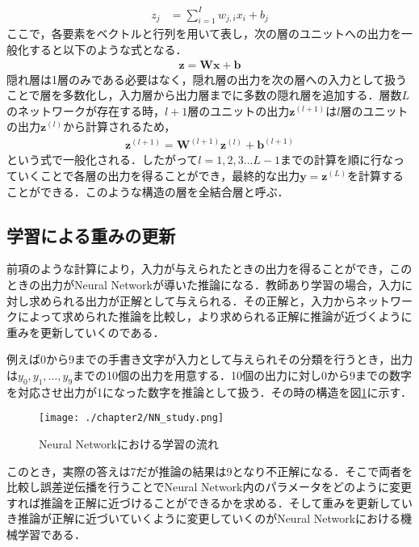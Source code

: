 \begin{align}
z_{j} &= \sum^{I}_{i=1}w_{j,i}x_{i} + b_j
\label{nn_siki}
\end{align}
ここで，各要素をベクトルと行列を用いて表し，次の層のユニットへの出力を一般化すると以下のような式となる．
\begin{align}
\bm{z} = \bm{W}\bm{x} + \bm{b}
\end{align}
隠れ層は1層のみである必要はなく，隠れ層の出力を次の層への入力として扱うことで層を多数化し，入力層から出力層までに多数の隠れ層を追加する．層数$L$のネットワークが存在する時，$l+1$層のユニットの出力$\bm{z}^{(l+1)}$は$l$層のユニットの出力$\bm{z}^{(l)}$から計算されるため，
\begin{align}
\bm{z}^{(l+1)} = \bm{W}^{(l+1)}\bm{z}^{(l)} + \bm{b}^{(l+1)}
\label{jundenpan}
\end{align}
という式で一般化される．したがって$l=1,2,3\ldots L-1$までの計算を順に行なっていくことで各層の出力を得ることができ，最終的な出力$\bm{y}=\bm{z}^{(L)}$を計算することができる．このような構造の層を全結合層と呼ぶ．


\subsection{学習による重みの更新}
前項のような計算により，入力が与えられたときの出力を得ることができ，このときの出力がNeural Networkが導いた推論になる．教師あり学習の場合，入力に対し求められる出力が正解として与えられる．その正解と，入力からネットワークによって求められた推論を比較し，より求められる正解に推論が近づくように重みを更新していくのである．

例えば0から9までの手書き文字が入力として与えられその分類を行うとき，出力は$y_0, y_1, \ldots , y_9$までの10個の出力を用意する．10個の出力に対し0から9までの数字を対応させ出力が1になった数字を推論として扱う．その時の構造を図\ref{fig_study}に示す．
\begin{figure}[!b]
  \begin{center}
    \texttt{[image: ./chapter2/NN\_study.png]}
    \caption{Neural Networkにおける学習の流れ}
    \label{fig_study}
  \end{center}
\end{figure}

このとき，実際の答えは7だが推論の結果は9となり不正解になる．そこで両者を比較し誤差逆伝播を行うことでNeural Network内のパラメータをどのように変更すれば推論を正解に近づけることができるかを求める．そして重みを更新していき推論が正解に近づいていくように変更していくのがNeural Networkにおける機械学習である\cite{sinsou}．

